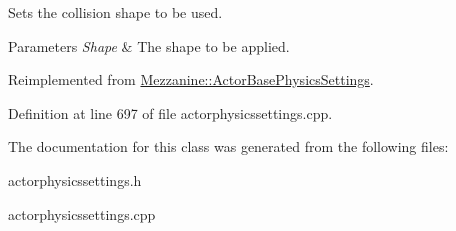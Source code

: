Sets the collision shape to be used. 


\begin{DoxyParams}{Parameters}
{\em Shape} & The shape to be applied. \\
\hline
\end{DoxyParams}


Reimplemented from \hyperlink{classMezzanine_1_1ActorBasePhysicsSettings_a9aa6c07c9cb235a417d68f1ea417f834}{Mezzanine::ActorBasePhysicsSettings}.



Definition at line 697 of file actorphysicssettings.cpp.



The documentation for this class was generated from the following files:\begin{DoxyCompactItemize}
\item 
actorphysicssettings.h\item 
actorphysicssettings.cpp\end{DoxyCompactItemize}
